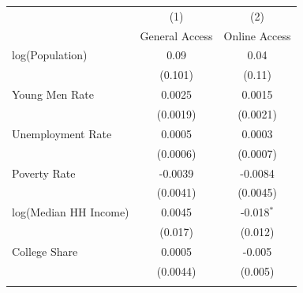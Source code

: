 \begin{tabular}{@{\extracolsep{5pt}} lcc} 
\toprule
\midrule
 & (1) & (2) \\
   & General Access  & Online Access  \\ 
\midrule

\enspace log(Population) & 0.09 & 0.04  \\ 
 & (0.101) & (0.11) \\ 
 \addlinespace
\enspace  Young Men Rate & 0.0025 & 0.0015 \\ 
  & (0.0019) & (0.0021) \\ 
 \addlinespace  
 \enspace  Unemployment Rate & 0.0005 & 0.0003 \\ 
 & (0.0006) & (0.0007) \\ 
 \addlinespace
\enspace Poverty Rate & -0.0039 & -0.0084 \\ 
 & (0.0041) & (0.0045) \\ 
 \addlinespace
 \enspace log(Median HH Income) & 0.0045 & -0.018$^{*}$ \\ 
  & (0.017) & (0.012) \\ 
 \addlinespace
 \enspace College Share & 0.0005 & -0.005 \\ 
  & (0.0044) & (0.005) \\ 
 \addlinespace
 
\bottomrule 
\end{tabular} 